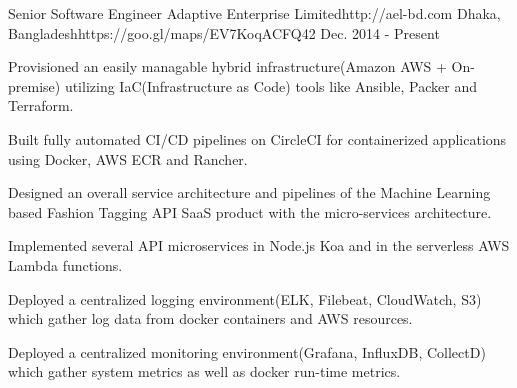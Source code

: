 

\begin{workentries}

\workentry
{Senior Software Engineer} %
{Adaptive Enterprise Limited}{http://ael-bd.com} %
{Dhaka, Bangladesh}{https://goo.gl/maps/EV7KoqACFQ42} %
{Dec. 2014 - Present} %
{
  \begin{workitems} %
    \item {Provisioned an easily managable hybrid infrastructure(Amazon AWS + On-premise) utilizing IaC(Infrastructure as Code) tools like Ansible, Packer and Terraform.}
    \item {Built fully automated CI/CD pipelines on CircleCI for containerized applications using Docker, AWS ECR and Rancher.}
    \item {Designed an overall service architecture and pipelines of the Machine Learning based Fashion Tagging API SaaS product with the micro-services architecture.}
    \item {Implemented several API microservices in Node.js Koa and in the serverless AWS Lambda functions.}
    \item {Deployed a centralized logging environment(ELK, Filebeat, CloudWatch, S3) which gather log data from docker containers and AWS resources.}
    \item {Deployed a centralized monitoring environment(Grafana, InfluxDB, CollectD) which gather system metrics as well as docker run-time metrics.}
  \end{workitems}
}


\end{workentries}
